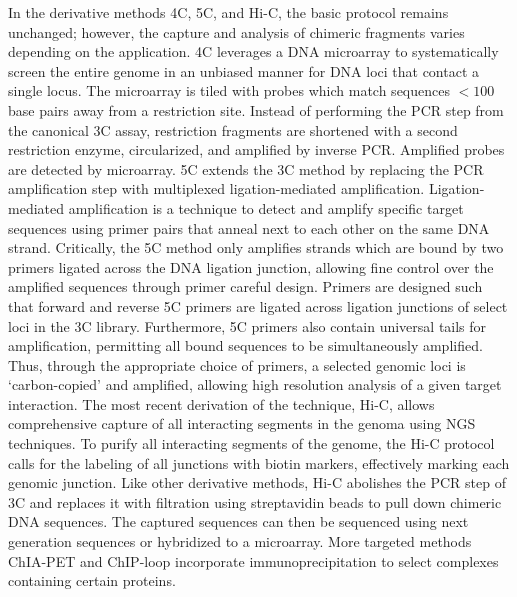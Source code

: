 In the derivative methods 4C, 5C, and Hi-C, the basic protocol remains unchanged; however, the capture and analysis of chimeric fragments varies
depending on the application.  \gls{4C} leverages a DNA microarray to systematically screen the entire genome in an unbiased manner for DNA loci
that contact a single locus\cite{simonis2006}.  The microarray is tiled with probes which match sequences $< 100$ base pairs away from a
restriction site.  Instead of performing the PCR step from the canonical \gls{3C} assay, restriction fragments are shortened with a
second restriction enzyme, circularized, and amplified by inverse PCR\@.  Amplified probes are detected by microarray\cite{simonis2006}.
\gls{5C} extends the \gls{3C} method by replacing the PCR amplification step with multiplexed ligation-mediated amplification.  Ligation-mediated
amplification is a technique to detect and amplify specific target sequences using primer pairs that anneal next to each other on the
same DNA strand\cite{dostie2006}. Critically, the 5C method only amplifies strands which are bound by two primers ligated across the DNA ligation
junction, allowing fine control over the amplified sequences through primer careful design.  Primers are designed such that forward and
reverse \gls{5C} primers are ligated across ligation junctions of select loci in the \gls{3C} library.  Furthermore, \gls{5C} primers also
contain universal tails for amplification, permitting all bound sequences to be simultaneously amplified.  Thus, through the appropriate choice of
primers, a selected genomic loci is `carbon-copied' and amplified, allowing high resolution analysis of a given target interaction\cite{dostie2006}.
The most recent derivation of the technique, Hi-C, allows comprehensive capture of all interacting segments in the genoma using \gls{NGS} techniques.
To purify all interacting segments of the genome, the Hi-C protocol calls for the labeling of all junctions with biotin markers, effectively
marking each genomic junction. Like other derivative methods, Hi-C abolishes the PCR step of \gls{3C} and replaces it with filtration using
streptavidin beads to pull down chimeric DNA sequences.  The captured sequences can then be sequenced using next generation sequences or hybridized
to a microarray.  More targeted methods ChIA-PET and ChIP-loop incorporate immunoprecipitation to select complexes containing certain proteins.

